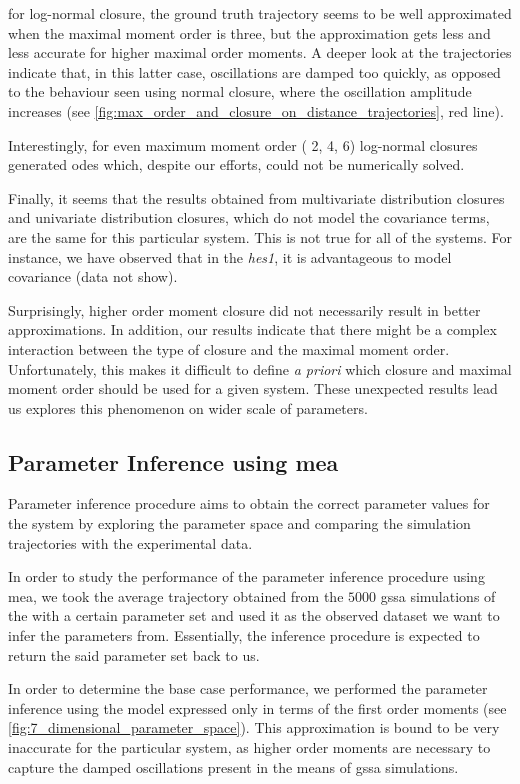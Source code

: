  
for log-normal closure, the ground truth trajectory seems to be well approximated when the maximal moment order is three, but the approximation gets less and less accurate for higher maximal order moments.
A deeper look at the trajectories indicate that, in this latter case,
oscillations are damped too quickly, as opposed to the behaviour seen using normal closure, where the oscillation amplitude increases (see \autoref{fig:max_order_and_closure_on_distance_trajectories}, red line).

Interestingly, for even maximum moment order (\ie{} 2, 4, 6) log-normal closures generated \gls{ode}s which, despite our efforts, could not be numerically solved.

Finally, it seems that the results obtained from multivariate distribution closures and  univariate distribution closures, which do not model the covariance terms, are the same for this particular system. 
This is not true for all of the systems. 
For instance, we have observed that in the \emph{hes1}, it is advantageous to model covariance (data not show).

Surprisingly, higher order moment closure did not necessarily result in better approximations.
In addition, our results indicate that there might be a complex interaction between the type of closure and the maximal moment order. 
Unfortunately, this makes it difficult to define \emph{a priori} which closure and maximal moment order should be used for a given system.
These unexpected results lead us explores this phenomenon on wider scale of parameters.

\subsection{Parameter Inference using \acrlong{mea}}
Parameter inference procedure aims to obtain the correct parameter values for the system by exploring the parameter space and comparing the simulation trajectories with the experimental data. 

In order to study the performance of the parameter inference procedure using \acrlong{mea}, we took the average trajectory obtained from the  $5000$ \gls{gssa} simulations of the \pft{} with a certain parameter set and used it as the observed dataset we want to infer the parameters from. Essentially, the inference procedure is expected to return the said parameter set back to us.

In order to determine the base case performance, we performed the parameter inference using the \pft{} model expressed only in terms of the first order moments (see \autoref{fig:7_dimensional_parameter_space}). This approximation is bound to be very inaccurate for the particular system, as higher order moments are necessary to capture the damped oscillations present in the means of \gls{gssa} simulations\cite{ale_general_2013}.


